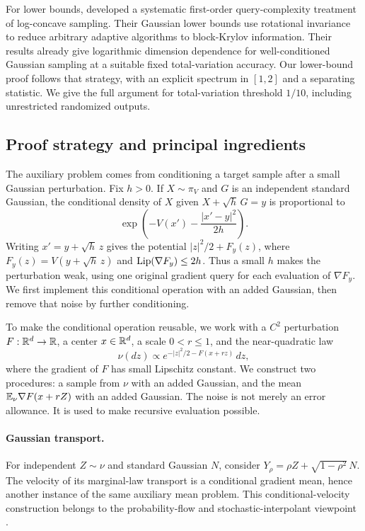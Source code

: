 For lower bounds, \citet{chewi2023lower} developed a systematic
first-order query-complexity treatment of log-concave sampling. Their
Gaussian lower bounds use rotational invariance to reduce arbitrary
adaptive algorithms to block-Krylov information. Their results already give logarithmic dimension dependence for
well-conditioned Gaussian sampling at a suitable fixed total-variation
accuracy. Our lower-bound proof follows that strategy, with an explicit
spectrum in \([1,2]\) and a separating statistic. We give the full argument for total-variation
threshold \(1/10\), including unrestricted randomized outputs.

\subsection{Proof strategy and principal ingredients}

The auxiliary problem comes from conditioning a target sample after a
small Gaussian perturbation. Fix $h>0$. If $X\sim\pi_V$ and $G$ is an independent
standard Gaussian, the conditional density of $X$ given
$X+\sqrt h\,G=y$ is proportional to
\[
 \exp\!\left(-V(x')-\frac{|x'-y|^2}{2h}\right).
\]
Writing $x'=y+\sqrt h\,z$ gives the potential
$|z|^2/2+F_y(z)$, where $F_y(z)=V(y+\sqrt h\,z)$ and
$\operatorname{Lip}(\nabla F_y)\le2h$. Thus a small $h$ makes the perturbation
weak, using one original gradient query for each evaluation of
$\nabla F_y$. We first implement this conditional operation with an
added Gaussian, then remove that noise by further conditioning.

To make the conditional operation reusable, we work with a $C^2$ perturbation
$F:\mathbb R^d\to\mathbb R$, a center $x\in\mathbb R^d$, a scale $0<r\le1$,
and the near-quadratic law
\[
                 \nu(dz)\propto
                 e^{-|z|^2/2-F(x+rz)}\,dz,
\]
where the gradient of $F$ has small Lipschitz constant.
We construct two procedures: a sample from \(\nu\)
with an added Gaussian, and the mean
\(\mathbb E_\nu\nabla F(x+rZ)\) with an added Gaussian.
The noise is not merely an error allowance. It is
used to make recursive evaluation possible.

\paragraph{Gaussian transport.}
For independent \(Z\sim\nu\) and standard Gaussian
\(N\), consider
\(Y_\rho=\rho Z+\sqrt{1-\rho^2}\,N\).
The velocity of its marginal-law transport is a
conditional gradient mean, hence another instance
of the same auxiliary mean problem. This
conditional-velocity construction belongs to the
probability-flow and stochastic-interpolant viewpoint
\citep{song2021score,albergo2025interpolants}.

